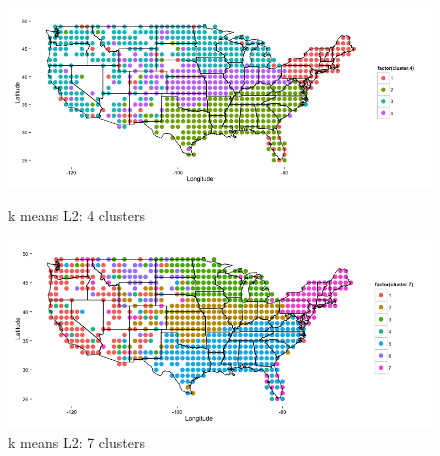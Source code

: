 \documentclass{article}\usepackage[]{graphicx}\usepackage[]{color}
\begin{document}
\begin{figure}[H]

\begin{minipage}{.5\textwidth}
\includegraphics[width=250pts, height=150pts]{4clustersmall.png}
\caption{k means L2: 4 clusters}
\end{minipage}
\begin{minipage}{.5\textwidth}
\includegraphics[width = 250pts, height=150pts]{7clustersmall.png}
\caption{k means L2: 7 clusters}
\end{minipage}
\end{figure}
\end{document}
